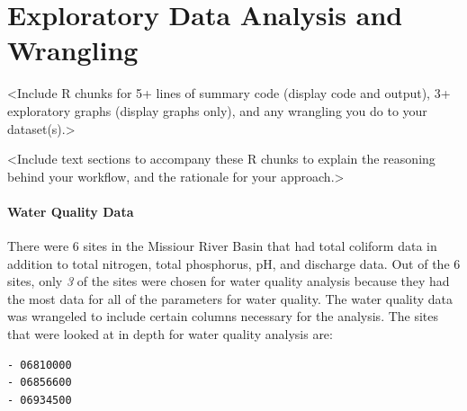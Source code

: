 \documentclass[12pt,]{article}
\let\oldparagraph\paragraph
\renewcommand{\paragraph}[1]{\oldparagraph{#1}\mbox{}}
\begin{document}
\hypertarget{exploratory-data-analysis-and-wrangling}{%
\section{Exploratory Data Analysis and
Wrangling}\label{exploratory-data-analysis-and-wrangling}}

\textless{}Include R chunks for 5+ lines of summary code (display code
and output), 3+ exploratory graphs (display graphs only), and any
wrangling you do to your dataset(s).\textgreater{}

\textless{}Include text sections to accompany these R chunks to explain
the reasoning behind your workflow, and the rationale for your
approach.\textgreater{}

\hypertarget{water-quality-data}{%
\paragraph{Water Quality Data}\label{water-quality-data}}

There were 6 sites in the Missiour River Basin that had total coliform
data in addition to total nitrogen, total phosphorus, pH, and discharge
data. Out of the 6 sites, only \emph{3} of the sites were chosen for
water quality analysis because they had the most data for all of the
parameters for water quality. The water quality data was wrangeled to
include certain columns necessary for the analysis. The sites that were
looked at in depth for water quality analysis are:

\begin{verbatim}
- 06810000
- 06856600
- 06934500
\end{verbatim}
\end{document}
